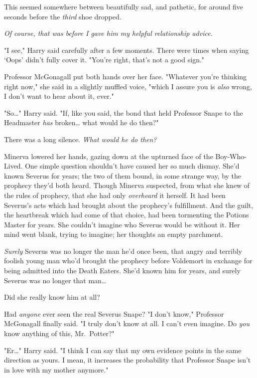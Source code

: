 This seemed somewhere between beautifully sad, and pathetic, for around five
seconds before the \emph{third} shoe dropped.

\emph{Of course, that was before I gave him my helpful relationship advice.}

"I see," Harry said carefully after a few moments. There were times when saying
`Oops' didn't fully cover it. "You're right, that's not a good sign."

Professor McGonagall put both hands over her face. "Whatever you're thinking
right now," she said in a slightly muffled voice, "which I assure you is
\emph{also} wrong, I don't want to hear about it, ever."

"So{\ldots}" Harry said. "If, like you said, the bond that held Professor Snape
to the Headmaster \emph{has} broken{\ldots} what would he do then?"

There was a long silence.
\later
\emph{What would he do then?}

Minerva lowered her hands, gazing down at the upturned face of the
Boy-Who-Lived. One simple question shouldn't have caused her so much dismay.
She'd known Severus for years; the two of them bound, in some strange way, by
the prophecy they'd both heard. Though Minerva suspected, from what she knew of
the rules of prophecy, that she had only \emph{overheard} it herself. It had
been Severus's acts which had brought about the prophecy's fulfillment. And the
guilt, the heartbreak which had come of that choice, had been tormenting the
Potions Master for years. She couldn't imagine who Severus would be without it.
Her mind went blank, trying to imagine; her thoughts an empty parchment.

\emph{Surely} Severus was no longer the man he'd once been, that angry and
terribly foolish young man who'd brought the prophecy before Voldemort in
exchange for being admitted into the Death Eaters. She'd known him for years,
and surely Severus was no longer that man{\ldots}

Did she really know him at all?

Had \emph{anyone} ever seen the real Severus Snape?
\later
"I don't know," Professor McGonagall finally said. "I truly don't know at all.
I can't even imagine. Do \emph{you} know anything of this, Mr.~Potter?"

"Er{\ldots}" Harry said. "I think I can say that my own evidence points in the
same direction as yours. I mean, it increases the probability that Professor
Snape isn't in love with my mother anymore."

